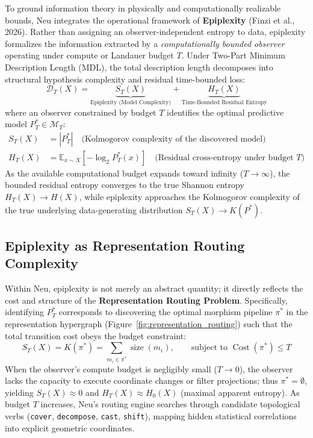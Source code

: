\documentclass[11pt]{article}
\begin{document}
To ground information theory in physically and computationally realizable bounds, Neu integrates the operational framework of \textbf{Epiplexity} (Finzi et al., 2026). Rather than assigning an observer-independent entropy to data, epiplexity formalizes the information extracted by a \emph{computationally bounded observer} operating under compute or Landauer budget $T$. Under Two-Part Minimum Description Length (MDL), the total description length decomposes into structural hypothesis complexity and residual time-bounded loss:
\begin{equation}
\mathcal{D}_T(X) = \underbrace{S_T(X)}_{\text{Epiplexity (Model Complexity)}} + \underbrace{H_T(X)}_{\text{Time-Bounded Residual Entropy}}
\end{equation}
where an observer constrained by budget $T$ identifies the optimal predictive model $P_T^* \in \mathcal{M}_T$:
\begin{align}
S_T(X) &= |P_T^*| \quad \text{(Kolmogorov complexity of the discovered model)} \\
H_T(X) &= \mathbb{E}_{x \sim X} \left[ -\log_2 P_T^*(x) \right] \quad \text{(Residual cross-entropy under budget $T$)}
\end{align}
As the available computational budget expands toward infinity ($T \to \infty$), the bounded residual entropy converges to the true Shannon entropy $H_T(X) \to H(X)$, while epiplexity approaches the Kolmogorov complexity of the true underlying data-generating distribution $S_T(X) \to K(P^*)$.

\subsection{Epiplexity as Representation Routing Complexity}
Within Neu, epiplexity is not merely an abstract quantity; it directly reflects the cost and structure of the \textbf{Representation Routing Problem}. Specifically, identifying $P_T^*$ corresponds to discovering the optimal morphism pipeline $\pi^*$ in the representation hypergraph (Figure~\ref{fig:representation_routing}) such that the total transition cost obeys the budget constraint:
\begin{equation}
S_T(X) = K(\pi^*) = \sum_{m_i \in \pi^*} \operatorname{size}(m_i), \qquad \text{subject to } \operatorname{Cost}(\pi^*) \le T
\end{equation}
When the observer's compute budget is negligibly small ($T \to 0$), the observer lacks the capacity to execute coordinate changes or filter projections; thus $\pi^* = \emptyset$, yielding $S_T(X) \approx 0$ and $H_T(X) \approx H_0(X)$ (maximal apparent entropy). As budget $T$ increases, Neu's routing engine searches through candidate topological verbs (\texttt{cover}, \texttt{decompose}, \texttt{cast}, \texttt{shift}), mapping hidden statistical correlations into explicit geometric coordinates.
\end{document}
